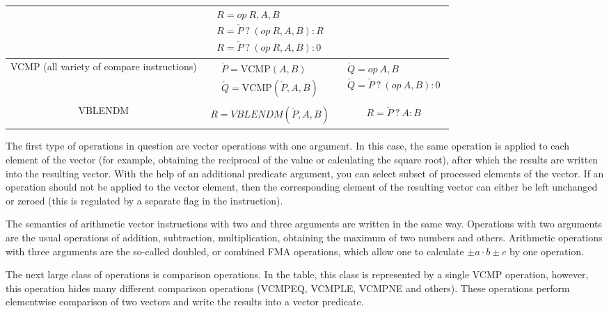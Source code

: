 \documentclass[
11pt,%
tightenlines,%
twoside,%
onecolumn,%
nofloats,%
nobibnotes,%
nofootinbib,%
superscriptaddress,%
noshowpacs,%
centertags]%
{revtex4}
\begin{document}
\begin{table}[!h]
\begin{tabular}{|c|c|c|}
& $\begin{matrix} R = op \ R, A, B \\ R = \check{P} \ ? \ (op \ R, A, B) : R \\ R = \check{P} \ ? \ (op \ R, A, B) : 0 \end{matrix}$ \\
\hline
\parbox{8cm}{VCMP (all variety of compare instructions)}
& $\begin{matrix} \check{P} = \text{VCMP}(A, B) \\ \check{Q} = \text{VCMP}(\check{P}, A, B) \end{matrix}$
& $\begin{matrix} \check{Q} = op \ A, B \\ \check{Q} = \check{P} \ ? \ (op \ A, B) : 0 \end{matrix}$ \\
\hline
\parbox{8cm}{VBLENDM}
& $\begin{matrix} R = VBLENDM(\check{P}, A, B) \end{matrix}$
& $\begin{matrix} R = \check{P} \ ? \ A : B \end{matrix}$ \\
\hline
\end{tabular}
\label{tab:avx512instructions}
\end{table}   

The first type of operations in question are vector operations with one argument.
In this case, the same operation is applied to each element of the vector (for example, obtaining the reciprocal of the value or calculating the square root), after which the results are written into the resulting vector.
With the help of an additional predicate argument, you can select subset of processed elements of the vector.
If an operation should not be applied to the vector element, then the corresponding element of the resulting vector can either be left unchanged or zeroed (this is regulated by a separate flag in the instruction).

The semantics of arithmetic vector instructions with two and three arguments are written in the same way.
Operations with two arguments are the usual operations of addition, subtraction, multiplication, obtaining the maximum of two numbers and others.
Arithmetic operations with three arguments are the so-called doubled, or combined FMA operations, which allow one to calculate $\pm a \cdot b \pm c$ by one operation.

The next large class of operations is comparison operations.
In the table, this class is represented by a single VCMP operation, however, this operation hides many different comparison operations (VCMPEQ, VCMPLE, VCMPNE and others).
These operations perform elementwise comparison of two vectors and write the results into a vector predicate.
\end{document}

